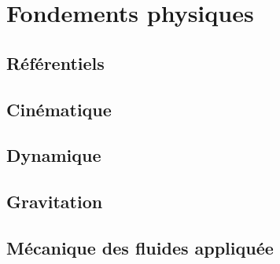 
\chapter*{}

\cleardoublepage
{}
\renewcommand{\CurrentPartColor}{Part1Color}
\renewcommand{\CurrentPartNumber}{Partie 01}
\renewcommand{\CurrentPartName}{Fondements physiques}
\renewcommand{\CurrentChapterType}{Chapitre}


\part{Fondements physiques}

    \chapter{Référentiels}
    \label{chap:referentiels}
    

    \chapter{Cinématique}
    \label{chap:cinematique}
    

    \chapter{Dynamique}
    \label{chap:dynamique}
    

    \chapter{Gravitation}
    \label{chap:gravitation}
    

    \chapter{Mécanique des fluides appliquée}
    \label{chap:mecanique_des_fluides}
    

